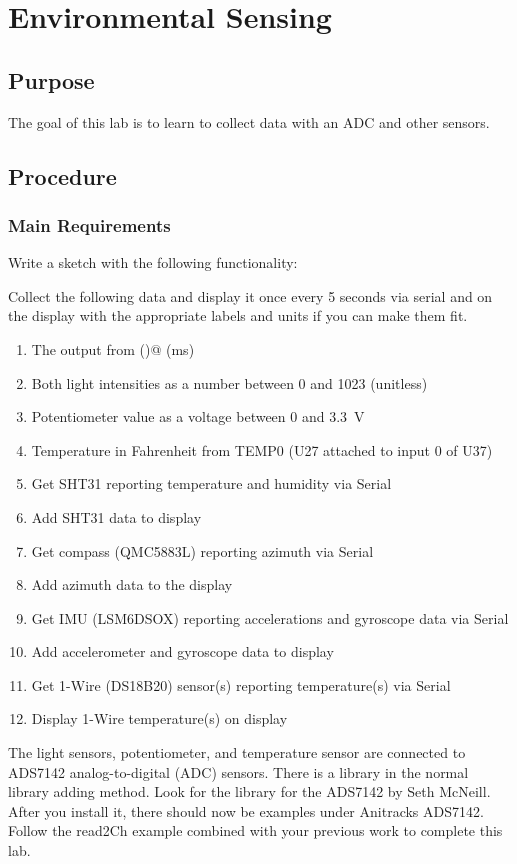 \chapter{Environmental Sensing}

\section{Purpose}
The goal of this lab is to learn to collect data with an ADC and other sensors.

\section{Procedure}
\subsection{Main Requirements}
Write a sketch with the following functionality:

Collect the following data and display it once every 5 seconds via serial and on the display with the 
appropriate labels and units if you can make them fit.
\begin{enumerate}
	\item The output from \lstinline@millis()@ (ms)
	\item Both light intensities as a number between 0 and 1023 (unitless)
	\item Potentiometer value as a voltage between 0 and 3.3~V
	\item Temperature in Fahrenheit from TEMP0 (U27 attached to input 0 of U37)
    \item Get SHT31 reporting temperature and humidity via Serial
    \item Add SHT31 data to display 
    \item Get compass (QMC5883L) reporting azimuth via Serial
    \item Add azimuth data to the display
    \item Get IMU (LSM6DSOX) reporting accelerations and gyroscope data via Serial 
    \item Add accelerometer and gyroscope data to display
    \item Get 1-Wire (DS18B20) sensor(s) reporting temperature(s) via Serial
    \item Display 1-Wire temperature(s) on display
\end{enumerate}

The light sensors, potentiometer, and temperature sensor are connected to ADS7142 
analog-to-digital (ADC) sensors. There is a library in the normal library adding 
method. Look for the library for the ADS7142 by Seth McNeill. After you install it,
there should now be examples under Anitracks ADS7142. Follow the read2Ch example 
combined with your previous work to complete this lab.

